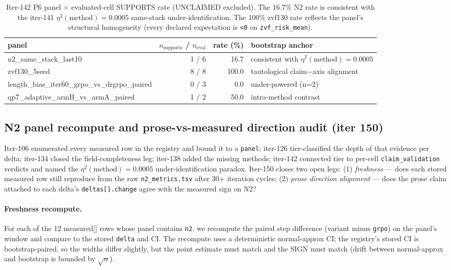 \documentclass{article}
\begin{document}
\begin{table}[t]
\centering
\small
\caption{Iter-142 P6 panel $\times$ evaluated-cell SUPPORTS rate (UNCLAIMED
excluded).  The 16.7\% N2 rate is consistent with the iter-141
$\eta^2(\text{method}) = 0.0005$ same-stack under-identification.  The
100\% zvf130 rate reflects the panel's structural homogeneity (every
declared expectation is \texttt{<0} on \texttt{zvf\_risk\_mean}).}
\label{tab:p6-iter142-panel-paradox}
\begin{tabular}{lrrl}
\toprule
panel & $n_{\text{supports}}$ / $n_{\text{eval}}$ & rate (\%) & bootstrap anchor \\
\midrule
n2\_same\_stack\_last10              & 1 / 6  & 16.7  & consistent with $\eta^2(\text{method}) = 0.0005$ \\
zvf130\_5seed                        & 8 / 8  & 100.0 & tautological claim$-$axis alignment \\
length\_bias\_iter60\_grpo\_vs\_drgrpo\_paired & 0 / 3 & 0.0   & under-powered (n=2) \\
qp7\_adaptive\_armB\_vs\_armA\_paired & 1 / 2 & 50.0 & intra-method contrast \\
\bottomrule
\end{tabular}
\end{table}
 

\subsection{N2 panel recompute and prose-vs-measured direction audit (iter 150)}
\label{sec:p6-iter150-recompute-prose}

Iter-106 enumerated every measured row in the registry and bound it to a
\texttt{panel}; iter-126 tier-classified the depth of that evidence per
delta; iter-134 closed the field-completeness leg; iter-138 added the
missing methods; iter-142 connected tier to per-cell
\texttt{claim\_validation} verdicts and named the $\eta^2(\text{method})
= 0.0005$ under-identification paradox. Iter-150 closes two open legs:
(1) \emph{freshness} --- does each stored measured row still reproduce
from the raw \texttt{n2\_metrics.tsv} after 30+ iteration cycles; (2)
\emph{prose direction alignment} --- does the prose claim attached to
each delta's \texttt{deltas[].change} agree with the measured sign on
N2?

\paragraph{Freshness recompute.}
For each of the 12 measured[] rows whose panel contains \texttt{n2}, we
recompute the paired step difference (variant minus \texttt{grpo}) on
the panel's window and compare to the stored \texttt{delta} and CI.
The recompute uses a deterministic normal-approx CI; the registry's
stored CI is bootstrap-paired, so the widths differ slightly, but the
point estimate must match and the SIGN must match (drift between
normal-approx and bootstrap is bounded by $\sqrt{n}$).
\end{document}
